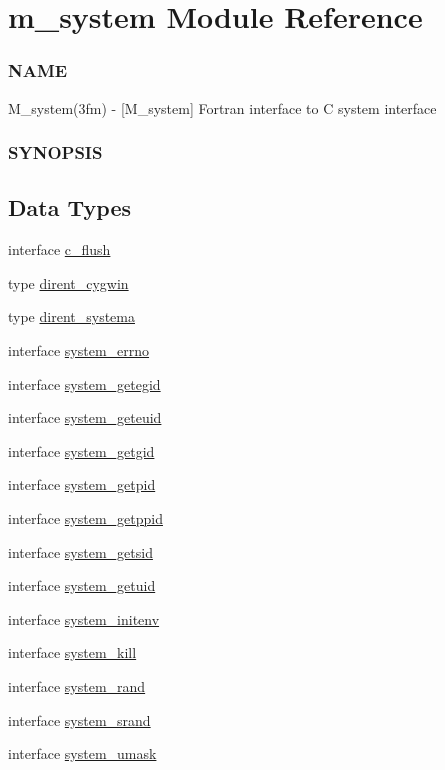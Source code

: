 \hypertarget{namespacem__system}{}\section{m\+\_\+system Module Reference}
\label{namespacem__system}


\subsubsection*{N\+A\+ME}

M\+\_\+system(3fm) -\/ \mbox{[}M\+\_\+system\mbox{]} Fortran interface to C system interface \subsubsection*{S\+Y\+N\+O\+P\+S\+IS} 


\subsection*{Data Types}
\begin{DoxyCompactItemize}
\item 
interface \hyperlink{interfacem__system_1_1c__flush}{c\+\_\+flush}
\item 
type \hyperlink{structm__system_1_1dirent__cygwin}{dirent\+\_\+cygwin}
\item 
type \hyperlink{structm__system_1_1dirent__systema}{dirent\+\_\+systema}
\item 
interface \hyperlink{interfacem__system_1_1system__errno}{system\+\_\+errno}
\item 
interface \hyperlink{interfacem__system_1_1system__getegid}{system\+\_\+getegid}
\item 
interface \hyperlink{interfacem__system_1_1system__geteuid}{system\+\_\+geteuid}
\item 
interface \hyperlink{interfacem__system_1_1system__getgid}{system\+\_\+getgid}
\item 
interface \hyperlink{interfacem__system_1_1system__getpid}{system\+\_\+getpid}
\item 
interface \hyperlink{interfacem__system_1_1system__getppid}{system\+\_\+getppid}
\item 
interface \hyperlink{interfacem__system_1_1system__getsid}{system\+\_\+getsid}
\item 
interface \hyperlink{interfacem__system_1_1system__getuid}{system\+\_\+getuid}
\item 
interface \hyperlink{interfacem__system_1_1system__initenv}{system\+\_\+initenv}
\item 
interface \hyperlink{interfacem__system_1_1system__kill}{system\+\_\+kill}
\item 
interface \hyperlink{interfacem__system_1_1system__rand}{system\+\_\+rand}
\item 
interface \hyperlink{interfacem__system_1_1system__srand}{system\+\_\+srand}
\item 
interface \hyperlink{interfacem__system_1_1system__umask}{system\+\_\+umask}
\end{DoxyCompactItemize}
